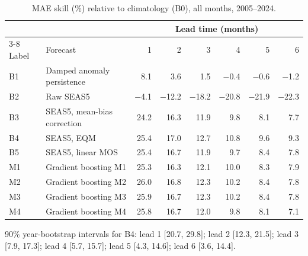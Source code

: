 \begin{table}[!htbp]\centering\small
\caption{MAE skill (\%) relative to climatology (B0), all months, 2005--2024.}\label{tab:skill}
\begin{tabular}{@{}llrrrrrr@{}}
\toprule
 & & \multicolumn{6}{c}{Lead time (months)} \\ \cmidrule(l){3-8}
Label & Forecast & 1 & 2 & 3 & 4 & 5 & 6 \\
\midrule
B1 & Damped anomaly persistence & 8.1 & 3.6 & 1.5 & −0.4 & −0.6 & −1.2 \\
B2 & Raw SEAS5 & −4.1 & −12.2 & −18.2 & −20.8 & −21.9 & −22.3 \\
B3 & SEAS5, mean-bias correction & 24.2 & 16.3 & 11.9 & 9.8 & 8.1 & 7.7 \\
B4 & SEAS5, EQM & 25.4 & 17.0 & 12.7 & 10.8 & 9.6 & 9.3 \\
B5 & SEAS5, linear MOS & 25.4 & 16.7 & 11.9 & 9.7 & 8.4 & 7.8 \\
\midrule
M1 & Gradient boosting M1 & 25.3 & 16.3 & 12.1 & 10.0 & 8.3 & 7.9 \\
M2 & Gradient boosting M2 & 26.0 & 16.8 & 12.3 & 10.2 & 8.4 & 7.8 \\
M3 & Gradient boosting M3 & 25.9 & 16.7 & 12.3 & 10.2 & 8.4 & 7.8 \\
M4 & Gradient boosting M4 & 25.8 & 16.7 & 12.0 & 9.8 & 8.1 & 7.1 \\
\bottomrule
\end{tabular}

\smallskip\parbox{\linewidth}{\footnotesize 90\% year-bootstrap intervals for B4: lead 1 [20.7, 29.8]; lead 2 [12.3, 21.5]; lead 3 [7.9, 17.3]; lead 4 [5.7, 15.7]; lead 5 [4.3, 14.6]; lead 6 [3.6, 14.4].}
\end{table}
